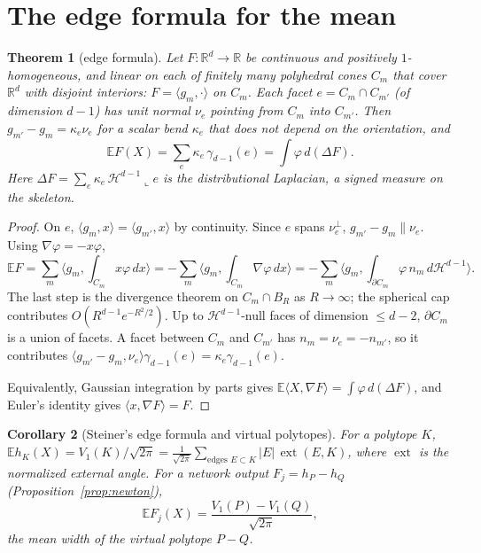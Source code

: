 \documentclass[11pt]{article}
\newtheorem{theorem}{Theorem}[section]
\newtheorem{corollary}[theorem]{Corollary}
\theoremstyle{definition}
\theoremstyle{remark}
\newcommand{\R}{\mathbb R}
\newcommand{\E}{\mathbb E}
\newcommand{\ext}{\operatorname{ext}}
\newcommand{\Hd}{\mathcal H^{d-1}}
\begin{document}
\section{The edge formula for the mean}

\begin{theorem}[edge formula]\label{thm:edge}
Let $F:\R^d\to\R$ be continuous and positively $1$-homogeneous, and linear on each of finitely many polyhedral cones $C_m$ that cover $\R^d$ with disjoint interiors: $F=\langle g_m,\cdot\rangle$ on $C_m$. Each facet $e=C_m\cap C_{m'}$ (of dimension $d-1$) has unit normal $\nu_e$ pointing from $C_m$ into $C_{m'}$. Then $g_{m'}-g_m=\kappa_e\nu_e$ for a scalar bend $\kappa_e$ that does not depend on the orientation, and
\begin{equation}\label{eq:edge}
\E F(X)=\sum_{e}\kappa_e\,\gamma_{d-1}(e)=\int\varphi\,d(\Delta F).
\end{equation}
Here $\Delta F=\sum_e\kappa_e\,\Hd\llcorner e$ is the distributional Laplacian, a signed measure on the skeleton.
\end{theorem}

\begin{proof}
On $e$, $\langle g_m,x\rangle=\langle g_{m'},x\rangle$ by continuity. Since $e$ spans $\nu_e^\perp$, $g_{m'}-g_m\parallel\nu_e$. Using $\nabla\varphi=-x\varphi$,
\[\E F=\sum_m\Big\langle g_m,\int_{C_m}x\varphi\,dx\Big\rangle=-\sum_m\Big\langle g_m,\int_{C_m}\nabla\varphi\,dx\Big\rangle=-\sum_m\Big\langle g_m,\int_{\partial C_m}\varphi\,n_m\,d\Hd\Big\rangle.\]
The last step is the divergence theorem on $C_m\cap B_R$ as $R\to\infty$; the spherical cap contributes $O(R^{d-1}e^{-R^2/2})$. Up to $\Hd$-null faces of dimension $\le d-2$, $\partial C_m$ is a union of facets. A facet between $C_m$ and $C_{m'}$ has $n_m=\nu_e=-n_{m'}$, so it contributes $\langle g_{m'}-g_m,\nu_e\rangle\gamma_{d-1}(e)=\kappa_e\gamma_{d-1}(e)$.

Equivalently, Gaussian integration by parts gives $\E\langle X,\nabla F\rangle=\int\varphi\,d(\Delta F)$, and Euler's identity gives $\langle x,\nabla F\rangle=F$.
\end{proof}

\begin{corollary}[Steiner's edge formula and virtual polytopes]\label{cor:v1}
For a polytope $K$, $\E h_K(X)=V_1(K)/\sqrt{2\pi}=\frac1{\sqrt{2\pi}}\sum_{\text{edges }E\subset K}|E|\,\ext(E,K)$, where $\ext$ is the normalized external angle. For a network output $F_j=h_P-h_Q$ (Proposition~\ref{prop:newton}),
\[\E F_j(X)=\frac{V_1(P)-V_1(Q)}{\sqrt{2\pi}},\]
the mean width of the virtual polytope $P-Q$.
\end{corollary}
\end{document}
